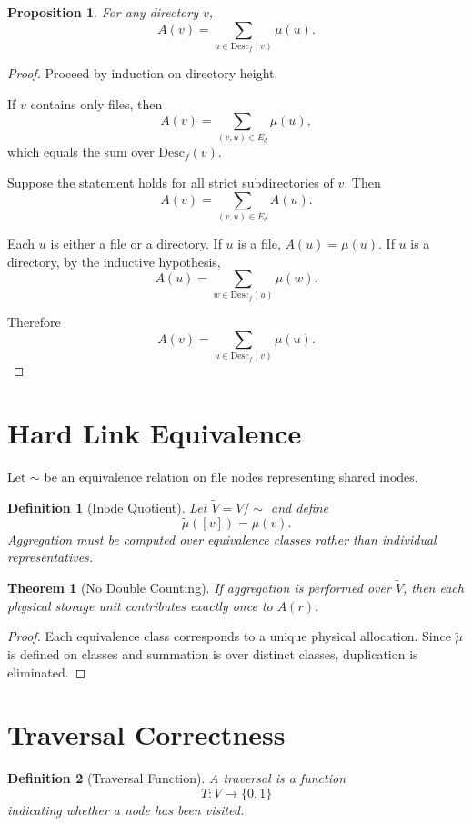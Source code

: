\documentclass[11pt]{article}
\newtheorem{definition}{Definition}
\newtheorem{proposition}{Proposition}
\newtheorem{theorem}{Theorem}
\begin{document}
\begin{proposition}
For any directory $v$,
\[
A(v) = \sum_{u \in \mathrm{Desc}_f(v)} \mu(u).
\]
\end{proposition}

\begin{proof}
Proceed by induction on directory height.

If $v$ contains only files, then
\[
A(v) = \sum_{(v,u)\in E_d} \mu(u),
\]
which equals the sum over $\mathrm{Desc}_f(v)$.

Suppose the statement holds for all strict subdirectories of $v$.
Then
\[
A(v) = \sum_{(v,u)\in E_d} A(u).
\]

Each $u$ is either a file or a directory.
If $u$ is a file, $A(u)=\mu(u)$.
If $u$ is a directory, by the inductive hypothesis,
\[
A(u) = \sum_{w \in \mathrm{Desc}_f(u)} \mu(w).
\]

Therefore
\[
A(v) = \sum_{u \in \mathrm{Desc}_f(v)} \mu(u).
\]
\end{proof}

\section{Hard Link Equivalence}

Let $\sim$ be an equivalence relation on file nodes representing shared inodes.

\begin{definition}[Inode Quotient]
Let $\tilde{V} = V / \sim$ and define
\[
\tilde{\mu}([v]) = \mu(v).
\]
Aggregation must be computed over equivalence classes rather than individual representatives.
\end{definition}

\begin{theorem}[No Double Counting]
If aggregation is performed over $\tilde{V}$, then each physical storage unit contributes exactly once to $A(r)$.
\end{theorem}

\begin{proof}
Each equivalence class corresponds to a unique physical allocation.
Since $\tilde{\mu}$ is defined on classes and summation is over distinct classes,
duplication is eliminated.
\end{proof}

\section{Traversal Correctness}

\begin{definition}[Traversal Function]
A traversal is a function
\[
T : V \to \{0,1\}
\]
indicating whether a node has been visited.
\end{definition}
\end{document}

